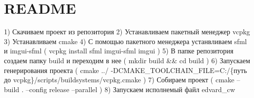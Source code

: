 \chapter{README}
\hypertarget{md__r_e_a_d_m_e}{}\label{md__r_e_a_d_m_e}
1) Скачиваем проект из репозитория 2) Устанавливаем пакетный менеджер vcpkg 3) Устанавливаем cmake 4) С помощью пакетного менеджера устанвливаем sfml и imgui-\/sfml ( vcpkg install sfml imgui-\/sfml imgui ) 5) В папке репозитория создаем папку build и переходим в нее ( mkdir build \&\& cd build ) 6) Запускаем генерирования проекта ( cmake ../ -\/DCMAKE\+\_\+\+TOOLCHAIN\+\_\+\+FILE=C\+:/\{путь до vcpkg\}/scripts/buildsystems/vcpkg.cmake ) 7) Собираем проект ( cmake --build . --config release --parallel ) 8) Запускаем исполнемый файл edvard\+\_\+cw 